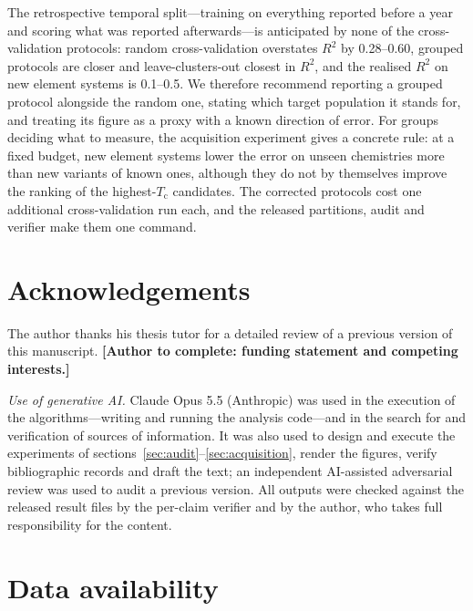 \documentclass{iopjournal}
\newcommand{\Tc}{T_{\mathrm c}}
\newcommand{\Rsq}{R^{2}}
\begin{document}
The retrospective temporal split---training on everything reported before a
year and scoring what was reported afterwards---is anticipated by none of the cross-validation protocols: random cross-validation overstates $\Rsq$ by \numrange{0.28}{0.60}, grouped protocols
are closer and leave-clusters-out closest in $\Rsq$, and the realised $\Rsq$ on new element systems
is \numrange{0.1}{0.5}. We therefore recommend reporting a grouped protocol alongside the random
one, stating which target population it stands for, and treating its figure as a proxy with a known direction of error. For groups deciding what to measure, the acquisition experiment gives a concrete rule: at a fixed budget, new element systems lower the error on unseen chemistries more than new variants of known ones, although they do not by themselves improve the ranking of the highest-$\Tc$ candidates. The corrected protocols cost one additional cross-validation run each, and the
released partitions, audit and verifier make them one command.

\section*{Acknowledgements}

The author thanks his thesis tutor for a detailed review of a previous version of this manuscript. \textbf{[Author to complete: funding statement and competing interests.]}

\textit{Use of generative AI.} Claude Opus 5.5 (Anthropic) was used in the execution of the algorithms---writing and running the analysis code---and in the search for and verification of sources of information. It was also used to design and execute the experiments of sections~\ref{sec:audit}--\ref{sec:acquisition}, render the figures, verify bibliographic records and draft the text; an independent AI-assisted adversarial review was used to audit a previous version. All outputs were checked against the released result files by the per-claim verifier and by the author, who takes full responsibility for the content.

\section*{Data availability}
\end{document}
